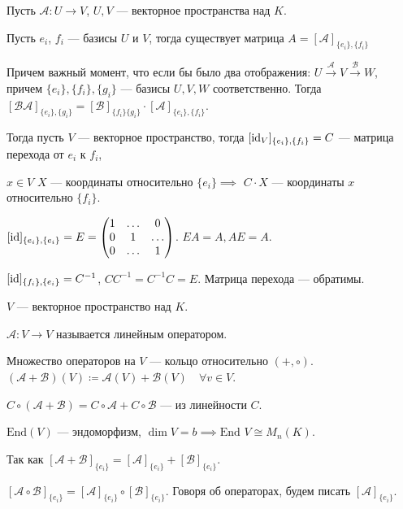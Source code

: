 Пусть $\mathcal{A}\!: U \to V$,  $U, V$ --- векторное пространства над  $K$. 

Пусть  $e_i$,  $f_i$ --- базисы $U$ и  $V$, тогда существует матрица  $A = [\mathcal{A}]_{\{e_i\}, \{f_i\}}$

Причем важный момент, что если бы было два отображения:  $U \xrightarrow{\mathcal{A}} V \xrightarrow{\mathcal{B}} W$, причем  $\{e_i\}, \{f_i\}, \{g_i\}$ --- базисы  $U, V, W$ соответственно.  Тогда  $[\mathcal{B}\mathcal{A}]_{\{e_i\}, \{g_i\}} = [\mathcal{B}]_{\{f_i\} \{g_i\} } \cdot [\mathcal{A}]_{\{e_i\}, \{f_i\}}$.

Тогда пусть $V$ --- векторное пространство, тогда  $[\operatorname{id}_V]_{\{e_i\}, \{f_i\}} = C$ --- матрица перехода от $e_i$ к  $f_i$,

$x \in V$  $X$ --- координаты относительно  $\{e_i\} \implies $  $C \cdot X$ --- координаты  $x$ относительно   $\{f_i\}$.

$[\operatorname{id}]_{\{e_i\}, \{e_i\}} = E = \begin{pmatrix} 1 & \ldots & 0 \\ 0 & 1 & \ldots \\ 0 & \ldots & 1 \end{pmatrix}$. $EA = A, AE = A$.

$[\operatorname{id}]_{\{f_i\}, \{e_i\}} = C^{-1}$,  $CC^{-1} = C^{-1}C = E$. Матрица перехода --- обратимы. 

\begin{definition}
    $V$ --- векторное пространство над  $K$.

    $\mathcal{A}\!: V \to V$ называется линейным оператором.
\end{definition}

Множество операторов на $V$ --- кольцо относительно  $(+, \circ)$.  $(\mathcal{A} + \mathcal{B})(V) \coloneqq \mathcal{A}(V) + \mathcal{B}(V) \quad \forall v \in V$.

$C \circ (\mathcal{A} + \mathcal{B}) = C \circ \mathcal{A} + C \circ \mathcal{B}$ --- из линейности $C$.

 \begin{definition}
     $\text{End}(V)$ --- эндоморфизм,  $\dim V = b \implies \text{End } V \cong M_n(K)$.
\end{definition}

Так как $[\mathcal{A} + \mathcal{B}]_{\{e_i\}} = [\mathcal{A}]_{\{e_i\}} + [\mathcal{B}]_{\{e_i\}}$.

$[\mathcal{A} \circ \mathcal{B}]_{\{e_i\}} = [\mathcal{A}]_{\{e_i\}} \circ [\mathcal{B}]_{\{e_i\}}$. Говоря об операторах, будем писать  $[\mathcal{A}]_{\{e_i\}}$.

